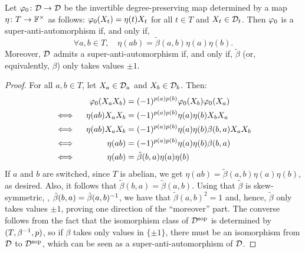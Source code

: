 \begin{prop}\label{prop:superpolarization}
	Let $\varphi_0\colon \mathcal{D} \to \mathcal{D}$ be the invertible degree-preserving map determined by a map $\eta\colon T \to \mathbb{F}^\times$ as follows: $\varphi_0(X_t) = \eta(t) X_t$ for all $t\in T$ and $X_t\in \mathcal{D}_t$.
	Then $\varphi_0$ is a super-anti-automorphism if, and only if, 
	\begin{equation}\label{eq:superpolarization}
		\forall a,b\in T, \quad \eta(ab) = \tilde\beta(a,b) \eta(a) \eta(b).
	\end{equation}
	Moreover, $\mathcal{D}$ admits a super-anti-automorphism if, and only if, $\tilde\beta$ (or, equivalently, $\beta$) only takes values $\pm 1$.
\end{prop}

\begin{proof}
	For all $a,b \in T$, let $X_a \in \mathcal{D}_a$ and $X_b\in \mathcal{D}_b$. 
	Then:
	\begin{alignat*}{2}
		     &  & \varphi_0(X_a X_b)             & = (-1)^{p(a) p(b)} \varphi_0(X_b) \varphi_0(X_a)          \\
		\iff &  & \,\, \eta(ab)X_a X_b         & = (-1)^{p(a) p(b)} \eta(a) \eta(b) X_b X_a            \\
		\iff &  & \, \eta(ab)X_a X_b           & = (-1)^{p(a) p(b)} \eta(a) \eta(b) \beta(b,a) X_a X_b \\
		\iff &  & \eta(ab)                     & = (-1)^{p(a) p(b)} \eta(a) \eta(b) \beta(b,a)
		\\
		\iff &  & \eta(ab)                     & = \tilde\beta(b,a) \eta(a) \eta(b)
	\end{alignat*}
	If $a$ and $b$ are switched, since $T$ is abelian, we get $\eta(ab) = \tilde\beta(a,b) \eta(a) \eta(b)$, as desired. 
	Also, it follows that $\tilde\beta(b,a) = \tilde\beta(a,b)$. 
	Using that $\tilde\beta$ is skew-symmetric, \ie,  $\tilde\beta(b, a) = \tilde\beta (a, b)^{-1}$, we have that $\tilde\beta(a,b)^2 = 1$ and, hence, $\tilde\beta$ only takes values $\pm 1$, proving one direction of the ``moreover'' part. 
	The converse follows from the fact that the isomorphism class of $\mathcal{D}^{\mathrm{sop}}$ is determined by $(T, \beta^{-1}, p)$, so if $\beta$ takes only values in $\{ \pm 1 \}$, there must be an isomorphism from $\mathcal{D}$ to $\mathcal{D}^{\mathrm{sop}}$, which can be seen as a super-anti-automorphism of $\mathcal{D}$.
\end{proof}

